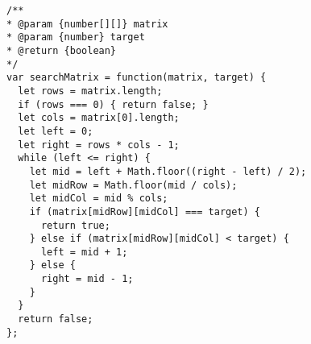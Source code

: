 \begin{verbatim}
/**
* @param {number[][]} matrix
* @param {number} target
* @return {boolean}
*/
var searchMatrix = function(matrix, target) {
  let rows = matrix.length;
  if (rows === 0) { return false; }
  let cols = matrix[0].length;
  let left = 0;
  let right = rows * cols - 1;
  while (left <= right) {
    let mid = left + Math.floor((right - left) / 2);
    let midRow = Math.floor(mid / cols);
    let midCol = mid % cols;
    if (matrix[midRow][midCol] === target) {
      return true;
    } else if (matrix[midRow][midCol] < target) {
      left = mid + 1;
    } else {
      right = mid - 1;
    }
  }
  return false;
};
\end{verbatim}

